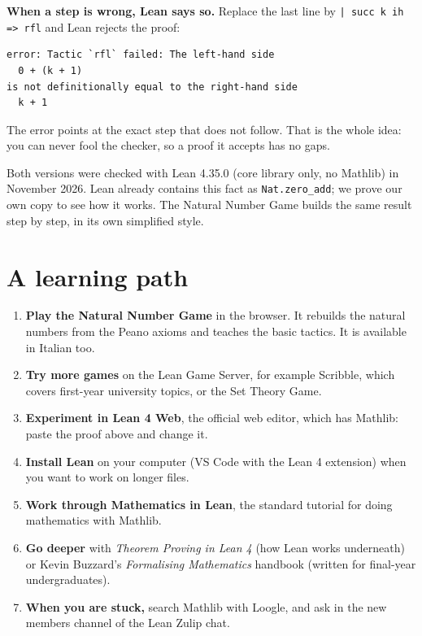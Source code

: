 \documentclass[11pt]{article}
\begin{document}
\textbf{When a step is wrong, Lean says so.} Replace the last line by
\texttt{| succ k ih => rfl} and Lean rejects the proof:

\begin{lstlisting}[keywordstyle=\color{ink}]
error: Tactic `rfl` failed: The left-hand side
  0 + (k + 1)
is not definitionally equal to the right-hand side
  k + 1
\end{lstlisting}

The error points at the exact step that does not follow. That is the whole idea:
you can never fool the checker, so a proof it accepts has no gaps.

{\small\color{muted}Both versions were checked with Lean 4.35.0 (core library
only, no Mathlib) in November 2026. Lean already contains this fact as
\texttt{Nat.zero\_add}; we prove our own copy to see how it works. The Natural
Number Game builds the same result step by step, in its own simplified style.}

\section{A learning path}
\begin{enumerate}[label=\textbf{\arabic*.}]
  \item \textbf{Play the Natural Number Game} in the browser. It rebuilds the
    natural numbers from the Peano axioms and teaches the basic tactics. It is
    available in Italian too.
  \item \textbf{Try more games} on the Lean Game Server, for example Scribble,
    which covers first-year university topics, or the Set Theory Game.
  \item \textbf{Experiment in Lean 4 Web}, the official web editor, which has
    Mathlib: paste the proof above and change it.
  \item \textbf{Install Lean} on your computer (VS Code with the Lean 4
    extension) when you want to work on longer files.
  \item \textbf{Work through Mathematics in Lean}, the standard tutorial for
    doing mathematics with Mathlib.
  \item \textbf{Go deeper} with \emph{Theorem Proving in Lean 4} (how Lean
    works underneath) or Kevin Buzzard's \emph{Formalising Mathematics}
    handbook (written for final-year undergraduates).
  \item \textbf{When you are stuck,} search Mathlib with Loogle, and ask in the
    new members channel of the Lean Zulip chat.
\end{enumerate}
\end{document}
